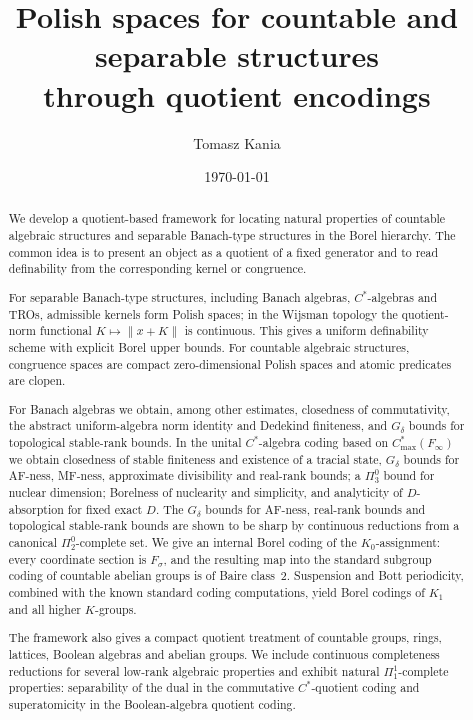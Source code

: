 \documentclass[12pt,fleqn,a4paper]{amsart}
\title[Polish spaces for countable and separable structures]
{Polish spaces for countable and separable structures\\ through quotient encodings}
\author[T.~Kania]{Tomasz Kania}
\date{\today}
\numberwithin{equation}{section}
\theoremstyle{definition}
\begin{document}
\begin{abstract}
We develop a quotient-based framework for locating natural properties of countable
algebraic structures and separable Banach-type structures in the Borel hierarchy.
The common idea is to present an object as a quotient of a fixed generator and to
read definability from the corresponding kernel or congruence.

For separable Banach-type structures, including Banach algebras, $C^*$-algebras and
TROs, admissible kernels form Polish spaces; in the Wijsman topology the quotient-norm
functional $K\mapsto \|x+K\|$ is continuous.  This gives a uniform definability
scheme with explicit Borel upper bounds.  For countable algebraic structures,
congruence spaces are compact zero-dimensional Polish spaces and atomic predicates are
clopen.

For Banach algebras we obtain, among other estimates, closedness of commutativity,
the abstract uniform-algebra norm identity and Dedekind finiteness, and $G_\delta$
bounds for topological stable-rank bounds.  In the unital $C^*$-algebra coding based
on $C^*_{\max}(F_\infty)$ we obtain closedness of stable finiteness and existence of
a tracial state, $G_\delta$ bounds for AF-ness, MF-ness, approximate divisibility and
real-rank bounds; a $\Pi^0_3$ bound for nuclear dimension; Borelness of nuclearity
and simplicity, and analyticity of $D$-absorption for fixed exact $D$.  The
$G_\delta$ bounds for AF-ness, real-rank bounds and topological stable-rank bounds
are shown to be sharp by continuous reductions from a canonical $\Pi^0_2$-complete
set.  We give an internal Borel coding of the
$K_0$-assignment: every coordinate section is $F_\sigma$, and the resulting map into
the standard subgroup coding of countable abelian groups is of Baire class~$2$.
Suspension and Bott periodicity, combined with the known standard coding computations,
yield Borel codings of $K_1$ and all higher $K$-groups.

The framework also gives a compact quotient treatment of countable groups, rings,
lattices, Boolean algebras and abelian groups.  We include continuous completeness
reductions for several low-rank algebraic properties and exhibit natural
$\Pi^1_1$-complete properties: separability of the dual in the commutative
$C^*$-quotient coding and superatomicity in the Boolean-algebra quotient coding.
\end{abstract}

\maketitle
\end{document}
